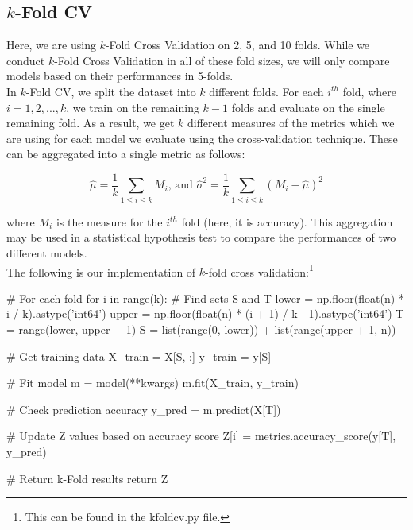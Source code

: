 \documentclass[fleqn]{article}
\begin{document}
    \subsection{$k$-Fold CV}

    Here, we are using $k$-Fold Cross Validation on 2, 5, and 10 folds. While we conduct
    $k$-Fold Cross Validation in all of these fold sizes, we will only compare models based on
    their performances in 5-folds.\\

    In $k$-Fold CV, we
    split the dataset into $k$ different folds. For each $i^{th}$ fold, where
    $ i = 1, 2,...,k $, we train on the remaining $ k-1 $ folds and evaluate on the single
    remaining fold. As a result, we get $ k $ different measures of the metrics which we
    are using for each model we evaluate using the cross-validation technique. These can
    be aggregated into a single metric as follows:

    $$  \hat\mu = \frac{1}{k} \sum_{1\leq i \leq k} M_i \text{, and }
        \hat\sigma^2 = \frac{1}{k} \sum_{1\leq i \leq k} (M_i - \hat\mu)^2 $$

    \noindent
    where $ M_i $ is the measure for the $i^{th}$ fold (here, it is accuracy). This
    aggregation may be used in a statistical hypothesis test to compare the performances
    of two different models.\\

    \noindent
    The following is our implementation of $k$-fold cross validation:\footnote{This can be
    found in the kfoldcv.py file.}

    \begin{python}
    # For each fold
    for i in range(k):
        # Find sets S and T
        lower = np.floor(float(n) * i / k).astype('int64')
        upper = np.floor(float(n) * (i + 1) / k - 1).astype('int64')
        T = range(lower, upper + 1)
        S = list(range(0, lower)) + list(range(upper + 1, n))

        # Get training data
        X_train = X[S, :]
        y_train = y[S]

        # Fit model
        m = model(**kwargs)
        m.fit(X_train, y_train)

        # Check prediction accuracy
        y_pred = m.predict(X[T])

        # Update Z values based on accuracy score
        Z[i] = metrics.accuracy_score(y[T], y_pred)

    # Return k-Fold results
    return Z
    \end{python}
\end{document}
